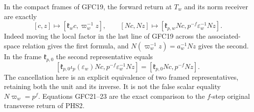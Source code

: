 In the compact frames of GFC19, the forward return at $T_w$ and
its norm receiver are exactly
\begin{equation}\tag{GFC22}
 [c,z]\longmapsto[\mathfrak{k}_wc,\varpi_w^{-1}z],\qquad
 [Nc,Nz]\longmapsto[\mathfrak{k}_{p,w}Nc,
                         p^{-f}\varepsilon_w^{-1}Nz].
\end{equation}
Indeed moving the local factor in the last line of GFC19 across
the associated-space relation gives the first formula, and
$N(\varpi_w^{-1}z)=a_w^{-1}Nz$ gives the second. In the frame
$\mathfrak{k}_{p,0}$ the second representative equals
\begin{equation}\tag{GFC23}
 [\mathfrak{k}_{p,0}\iota_p(\varepsilon_w)Nc,
                      p^{-f}\varepsilon_w^{-1}Nz]
       =[\mathfrak{k}_{p,0}Nc,p^{-f}Nz].
\end{equation}
The cancellation here is an explicit equivalence of two framed
representatives, retaining both the unit and its inverse. It is
not the false scalar equality $N\varpi_w=p^f$. Equations
GFC21--23 are the exact comparison to the $f$-step original
transverse return of PHS2.

